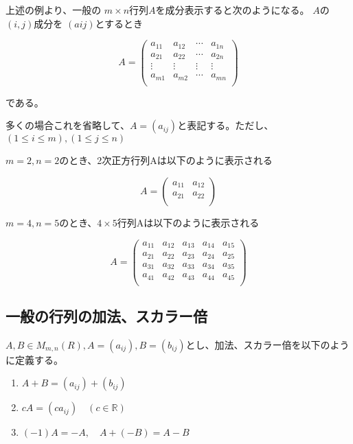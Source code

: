 \documentclass[dvipdfmx,autodetect-engine]{jsarticle}
\begin{document}

上述の例より、一般の $m \times n$行列$A$を成分表示すると次のようになる。 $A$の $(i, j)$成分を $(aij)$とするとき

$$
A = \begin{pmatrix}
a_{11} & a_{12} & \cdots & a_{1n} \\
a_{21} & a_{22} & \cdots & a_{2n} \\
\vdots & \vdots & \vdots & \vdots \\
a_{m1} & a_{m2} & \cdots & a_{mn} \\
\end{pmatrix}
$$

である。

多くの場合これを省略して、$A = (a_{ij})$と表記する。ただし、
$(1 \leq i \leq m), (1 \leq j \leq n)$


$m = 2, n = 2$のとき、2次正方行列Aは以下のように表示される

$$
A = \begin{pmatrix}
a_{11} & a_{12} \\
a_{21} & a_{22} \\
\end{pmatrix}
$$


$m = 4, n = 5$のとき、$4 \times 5$行列Aは以下のように表示される

$$
A = \begin{pmatrix}
a_{11} & a_{12} & a_{13} & a_{14} & a_{15} \\
a_{21} & a_{22} & a_{23} & a_{24} & a_{25} \\
a_{31} & a_{32} & a_{33} & a_{34} & a_{35} \\
a_{41} & a_{42} & a_{43} & a_{44} & a_{45} \\
\end{pmatrix}
$$

\subsection{一般の行列の加法、スカラー倍}\label{subsection:generalMatrixAdditionAndScalarMultiple}

\label{defi:additionAndScalarMultiple}

$A, B \in M_{m,n}(R), A = (a_{ij}), B = (b_{ij})$とし、加法、スカラー倍を以下のように定義する。

\begin{enumerate}
\renewcommand{\labelenumi}{(\arabic{enumi})}
\item $A + B = (a_{ij}) + (b_{ij})$
\item $cA = (ca_{ij}) \quad (c \in \mathbb{R})$
\item $(-1)A = -A, \quad A + (-B) = A - B$
\end{enumerate}
\end{document}
